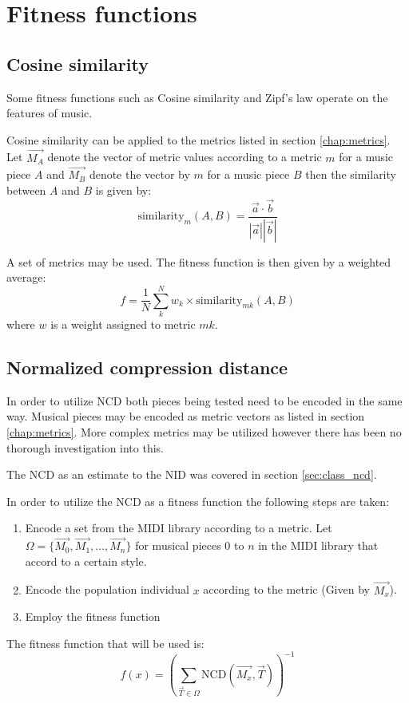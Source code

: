 \section{Fitness functions}
\subsection{Cosine similarity}
Some fitness functions such as Cosine similarity and Zipf's law operate on the features of music. 

Cosine similarity can be applied to the metrics listed in section \ref{chap:metrics}. Let $\vec{M_A}$ denote the vector of metric values according to a metric $m$ for a music piece $A$ and $\vec{M_B}$ denote the vector by $m$ for a music piece $B$ then the similarity between $A$ and $B$ is given by:
\[\text{similarity}_m(A,B) = \frac{\vec{a} \cdot \vec{b}}{|\vec{a}| |\vec{b}|}\]

A set of metrics may be used. 
The fitness function is then given by a weighted average:
\[f = \frac{1}{N} \sum_{k}^N w_k \times \text{similarity}_{mk}(A,B) \]
where $w$ is a weight assigned to metric $mk$.

\subsection{Normalized compression distance}
In order to utilize \ac{NCD} both pieces being tested need to be encoded in the same way. Musical pieces may be encoded as metric vectors as listed in section \ref{chap:metrics}. More complex metrics may be utilized however there has been no thorough investigation into this.

The \ac{NCD} as an estimate to the \ac{NID} was covered in section \ref{sec:class_ncd}.

In order to utilize the \ac{NCD} as a fitness function the following steps are taken:
\begin{enumerate}
\item Encode a set from the \ac{MIDI} library according to a metric. Let $\Omega = \{\vec{M_0}, \vec{M_1}, \ldots, \vec{M_n}\}$ for musical pieces $0$ to $n$ in the \ac{MIDI} library that accord to a certain style.
\item Encode the population individual $x$ according to the metric (Given by $\vec{M_x}$).
\item Employ the fitness function
\end{enumerate}

The fitness function that will be used is:
\[f(x) =  \left(\sum_{\vec{T}\in\Omega} \text{NCD}(\vec{M_x}, \vec{T}) \right)^{-1}\]

